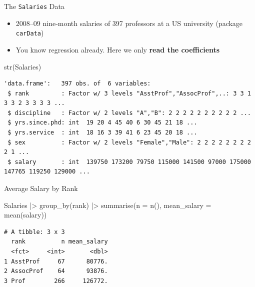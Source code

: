 \documentclass[
  ignorenonframetext,
  aspectratio=169,
]{beamer}
\newenvironment{Shaded}{\begin{snugshade}}{\end{snugshade}}
\newcommand{\AttributeTok}[1]{\textcolor[rgb]{0.40,0.45,0.13}{#1}}
\newcommand{\CommentTok}[1]{\textcolor[rgb]{0.37,0.37,0.37}{#1}}
\newcommand{\FunctionTok}[1]{\textcolor[rgb]{0.28,0.35,0.67}{#1}}
\newcommand{\NormalTok}[1]{\textcolor[rgb]{0.00,0.23,0.31}{#1}}
\newcommand{\OtherTok}[1]{\textcolor[rgb]{0.00,0.23,0.31}{#1}}
\newcommand{\SpecialCharTok}[1]{\textcolor[rgb]{0.37,0.37,0.37}{#1}}
\providecommand{\tightlist}{%
  \setlength{\itemsep}{0pt}\setlength{\parskip}{0pt}}\usepackage{longtable,booktabs,array}
\begin{document}
\begin{frame}[fragile]{The \texttt{Salaries} Data}
\protect\hypertarget{the-salaries-data}{}
\begin{itemize}
\tightlist
\item
  2008--09 nine-month salaries of 397 professors at a US university
  (package \texttt{carData})
\item
  You know regression already. Here we only \textbf{read the
  coefficients}
\end{itemize}

\begin{Shaded}
\begin{Highlighting}[]
\FunctionTok{str}\NormalTok{(Salaries)}
\end{Highlighting}
\end{Shaded}

\begingroup\tiny\color{darkgray}

\begin{verbatim}
'data.frame':   397 obs. of  6 variables:
 $ rank         : Factor w/ 3 levels "AsstProf","AssocProf",..: 3 3 1 3 3 2 3 3 3 3 ...
 $ discipline   : Factor w/ 2 levels "A","B": 2 2 2 2 2 2 2 2 2 2 ...
 $ yrs.since.phd: int  19 20 4 45 40 6 30 45 21 18 ...
 $ yrs.service  : int  18 16 3 39 41 6 23 45 20 18 ...
 $ sex          : Factor w/ 2 levels "Female","Male": 2 2 2 2 2 2 2 2 2 1 ...
 $ salary       : int  139750 173200 79750 115000 141500 97000 175000 147765 119250 129000 ...
\end{verbatim}

\endgroup
\end{frame}

\begin{frame}[fragile]{Average Salary by Rank}
\protect\hypertarget{average-salary-by-rank}{}
\begin{Shaded}
\begin{Highlighting}[]
\NormalTok{Salaries }\SpecialCharTok{|\textgreater{}}
  \FunctionTok{group\_by}\NormalTok{(rank) }\SpecialCharTok{|\textgreater{}}
  \FunctionTok{summarise}\NormalTok{(}\AttributeTok{n =} \FunctionTok{n}\NormalTok{(), }\AttributeTok{mean\_salary =} \FunctionTok{mean}\NormalTok{(salary))}
\end{Highlighting}
\end{Shaded}

\begingroup\tiny\color{darkgray}

\begin{verbatim}
# A tibble: 3 x 3
  rank          n mean_salary
  <fct>     <int>       <dbl>
1 AsstProf     67      80776.
2 AssocProf    64      93876.
3 Prof        266     126772.
\end{verbatim}

\endgroup

\begin{Shaded}
\end{Shaded}
\end{frame}
\end{document}
